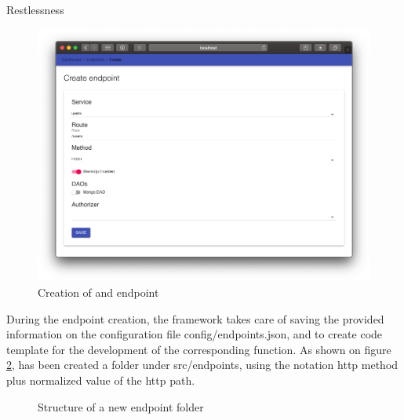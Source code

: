 \begin{chapter}{Restlessness}
    \begin{figure}
        \centering
        \includegraphics[width=\linewidth]{source/images/rln-wi-create-endpoint.png}
        \caption{Creation of and endpoint}
        \label{fig:wi_create_endpoint}
    \end{figure}

    During the endpoint creation, the framework takes care of saving the provided
    information on the configuration file config/endpoints.json, and to create code
    template for the development of the corresponding function.
    As shown on figure \ref{fig:new_endpoint_folder_structure}, has been created a
    folder under src/endpoints, using the notation http method plus normalized value
    of the http path.

    \begin{figure}
        \caption{Structure of a new endpoint folder}
        \label{fig:new_endpoint_folder_structure}
        \begin{minipage}{\linewidth}
        \end{minipage}
    \end{figure}


\end{chapter}
